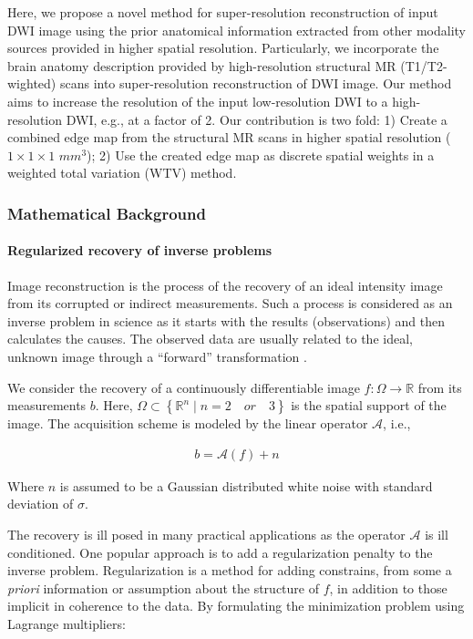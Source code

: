 Here, we propose a novel method for super-resolution reconstruction of input DWI image using the prior anatomical information extracted from other modality sources provided in higher spatial resolution.
Particularly, we incorporate the brain anatomy description provided by high-resolution structural MR (T1/T2-wighted) scans into super-resolution reconstruction of DWI image.
Our method aims to increase the resolution of the input low-resolution DWI to a high-resolution DWI, e.g., at a factor of 2. Our contribution is two fold: 1) Create a combined edge map from the structural MR scans in higher spatial resolution ($1 \times 1 \times 1$ $mm^3$); 2) Use the created edge map as discrete spatial weights in a weighted total variation (WTV) method.
\newline

\subsubsection{Mathematical Background} %

\paragraph{Regularized recovery of inverse problems} %

Image reconstruction is the process of the recovery of an ideal intensity image from its corrupted or indirect measurements. Such a process is considered as an inverse problem in science as it starts with the results (observations) and then calculates the causes. The observed data are usually related to the ideal, unknown image through a ``forward'' transformation \cite{geman95}.

We consider the recovery of a continuously differentiable image $f:\Omega \rightarrow \mathbb{R}$ from its measurements $b$. Here, $\Omega \subset \left \{ \mathbb{R}^{n} \mid n = 2 \quad or \quad 3 \right \}$ is the spatial support of the image. The acquisition scheme is modeled by the linear operator $\mathcal{A}$, i.e.,

\begin{equation}
\begin{gathered}
b = \mathcal{A}(f) + n
\end{gathered}
\end{equation}

Where $n$ is assumed to be a Gaussian distributed white noise with standard deviation of $\sigma$.

The recovery is ill posed in many practical applications as the operator $\mathcal{A}$ is ill conditioned. One popular approach is to add a regularization penalty to the inverse problem.
Regularization is a method for adding constrains, from some a \emph{priori} information or assumption about the structure of $f$, in addition to those implicit in coherence to the data.
By formulating the minimization problem using Lagrange multipliers:

